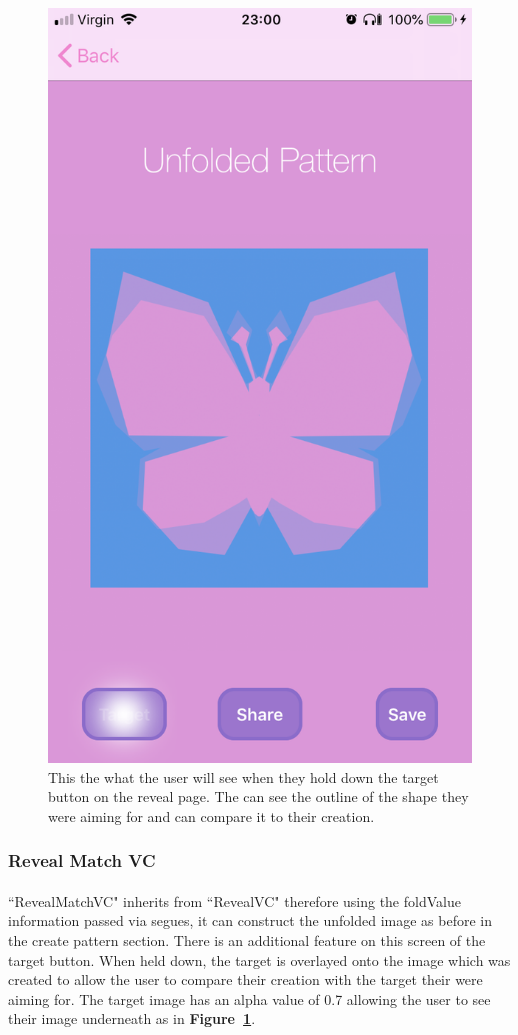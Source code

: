 \documentclass[11pt]{article}
\begin{document}
\begin{figure}[!ht]
\begin{minipage}{0.45\textwidth}
                            \includegraphics[width=0.7\linewidth]{KiriZen/matchUnfoldedPattern}
                            \caption{This the what the user will see when they hold down the target button on the reveal page. The can see the outline of the shape they were aiming for and can compare it to their creation.}
                            \label{fig:kiriZen-matchUnfoldedPattern}
                        \end{minipage}
                    \end{figure}
            
 \subsubsection{Reveal Match VC}
            \paragraph{}
            ``RevealMatchVC" inherits from ``RevealVC" therefore using the foldValue information passed via segues, it can construct the unfolded image as before in the create pattern section. There is an additional feature on this screen of the target button. When held down, the target is overlayed onto the image which was created to allow the user to compare their creation with the target their were aiming for. The target image has an alpha value of 0.7 allowing the user to see their image underneath as in \textbf{Figure~\ref{fig:kiriZen-matchUnfoldedPattern}}.
\end{document}
